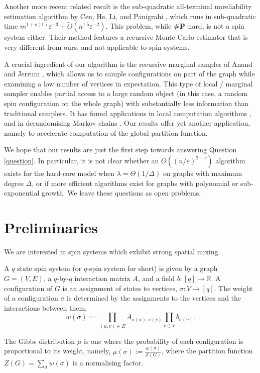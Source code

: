 \documentclass{theoretics}
\newcommand{\htodo}[1]{\todo[color=green!30]{Heng: #1}}
\newcommand{\eps}{\varepsilon}
\newcommand{\defeq}{:=}
\newcommand{\numP}{\#{\textnormal{\textbf{P}}}}
\begin{document}
Another more recent related result is the sub-quadratic all-terminal unreliability estimation algorithm by Cen, He, Li, and Panigrahi \cite{CHLP23},
which runs in sub-quadratic time $m^{1+o(1)}\eps^{-3}+\widetilde{O}(n^{1.5}\eps^{-2})$.
This problem, while $\numP$-hard, is not a spin system either.
Their method features a recursive Monte Carlo estimator that is very different from ours,
and not applicable to spin systems.

A crucial ingredient of our algorithm is the recursive marginal sampler of Anand and Jerrum \cite{AJ22}, which allows us to sample configurations on part of the graph while examining a low number of vertices in expectation.
This type of local / marginal sampler enables partial access to a large random object (in this case, a random spin configuration on the whole graph) with substantially less information than traditional samplers.
It has found applications in local computation algorithms \cite{BRY20}, and in derandomising Markov chains \cite{FGWWY22}.
Our results offer yet another application, namely to accelerate computation of the global partition function. 

We hope that our results are just the first step towards answering Question \eqref{question}.
In particular, it is not clear whether an $O((n/\eps)^{2-c})$ algorithm exists for the hard-core model when $\lambda=\Theta(1/\Delta)$ on graphs with maximum degree $\Delta$,
or if more efficient algorithms exist for graphs with polynomial or sub-exponential growth.
We leave these questions as open problems.

\section{Preliminaries}\label{sec:prelim}
We are interested in spin systems which exhibit strong spatial mixing. 

\begin{definition}
  A $q$ state spin system (or $q$-spin system for short) is given by a graph $G=(V,E)$, a $q$-by-$q$ interaction matrix $A$, and a field $b:[q]\rightarrow\mathbb{R}$. A configuration of $G$ is an assignment of states to vertices, $\sigma: V\rightarrow[q]$. The weight of a configuration $\sigma$ is determined by the assignments to the vertices and the interactions between them,
\[w(\sigma)\defeq\prod_{(u,v)\in E}A_{\sigma(u),\sigma(v)}\prod_{v\in V}b_{\sigma(v)}.\]

The Gibbs distribution $\mu$ is one where the probability of each configuration is proportional to its weight, namely, $\mu(\sigma)\defeq\frac{w(\sigma)}{Z(G)}$, where the partition function $Z(G)=\sum_\sigma w(\sigma)$ is a normalising factor. 
\end{definition}
\end{document}
